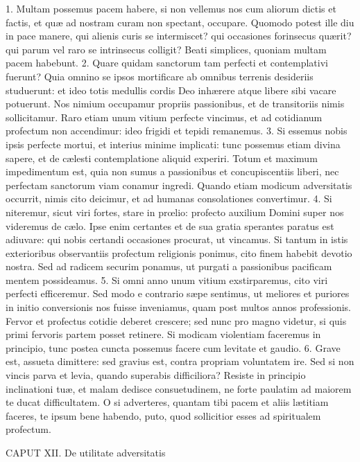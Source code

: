 \documentclass[twoside]{article}
\begin{document}
1. Multam possemus pacem habere, si non vellemus nos cum aliorum dictis et factis, et quæ ad nostram curam non spectant, occupare. Quomodo potest ille diu in pace manere, qui alienis curis se intermiscet? qui occasiones forinsecus quærit? qui parum vel raro se intrinsecus colligit? Beati simplices, quoniam multam pacem habebunt.
2. Quare quidam sanctorum tam perfecti et contemplativi fuerunt? Quia omnino se ipsos mortificare ab omnibus terrenis desideriis studuerunt: et ideo totis medullis cordis Deo inhærere atque libere sibi vacare potuerunt. Nos nimium occupamur propriis passionibus, et de transitoriis nimis sollicitamur. Raro etiam unum vitium perfecte vincimus, et ad cotidianum profectum non accendimur: ideo frigidi et tepidi remanemus.
3. Si essemus nobis ipsis perfecte mortui, et interius minime implicati: tunc possemus etiam divina sapere, et de cælesti contemplatione aliquid experiri. Totum et maximum impedimentum est, quia non sumus a passionibus et concupiscentiis liberi, nec perfectam sanctorum viam conamur ingredi. Quando etiam modicum adversitatis occurrit, nimis cito deicimur, et ad humanas consolationes convertimur.
4. Si niteremur, sicut viri fortes, stare in prœlio: profecto auxilium Domini super nos videremus de cælo. Ipse enim certantes et de sua gratia sperantes paratus est adiuvare: qui nobis certandi occasiones procurat, ut vincamus. Si tantum in istis exterioribus observantiis profectum religionis ponimus, cito finem habebit devotio nostra. Sed ad radicem securim ponamus, ut purgati a passionibus pacificam mentem possideamus.
5. Si omni anno unum vitium exstirparemus, cito viri perfecti efficeremur. Sed modo e contrario sæpe sentimus, ut meliores et puriores in initio conversionis nos fuisse inveniamus, quam post multos annos professionis. Fervor et profectus cotidie deberet crescere; sed nunc pro magno videtur, si quis primi fervoris partem posset retinere. Si modicam violentiam faceremus in principio, tunc postea cuncta possemus facere cum levitate et gaudio.
6. Grave est, assueta dimittere: sed gravius est, contra propriam voluntatem ire. Sed si non vincis parva et levia, quando superabis difficiliora? Resiste in principio inclinationi tuæ, et malam dedisce consuetudinem, ne forte paulatim ad maiorem te ducat difficultatem. O si adverteres, quantam tibi pacem et aliis lætitiam faceres, te ipsum bene habendo, puto, quod sollicitior esses ad spiritualem profectum.


CAPUT XII.
De utilitate adversitatis
\end{document}
